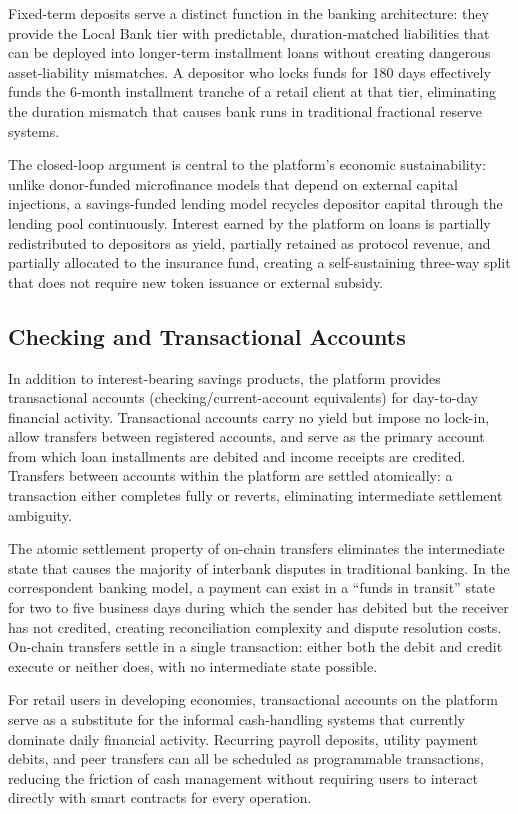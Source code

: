 \documentclass[12pt,a4paper]{report}
\begin{document}
Fixed-term deposits serve a distinct function in the banking architecture: they provide the Local Bank tier with predictable, duration-matched liabilities that can be deployed into longer-term installment loans without creating dangerous asset-liability mismatches. A depositor who locks funds for 180 days effectively funds the 6-month installment tranche of a retail client at that tier, eliminating the duration mismatch that causes bank runs in traditional fractional reserve systems.

The closed-loop argument is central to the platform's economic sustainability: unlike donor-funded microfinance models that depend on external capital injections, a savings-funded lending model recycles depositor capital through the lending pool continuously. Interest earned by the platform on loans is partially redistributed to depositors as yield, partially retained as protocol revenue, and partially allocated to the insurance fund, creating a self-sustaining three-way split that does not require new token issuance or external subsidy.

\subsection{Checking and Transactional Accounts}

In addition to interest-bearing savings products, the platform provides transactional accounts (checking/current-account equivalents) for day-to-day financial activity. Transactional accounts carry no yield but impose no lock-in, allow transfers between registered accounts, and serve as the primary account from which loan installments are debited and income receipts are credited. Transfers between accounts within the platform are settled atomically: a transaction either completes fully or reverts, eliminating intermediate settlement ambiguity.

The atomic settlement property of on-chain transfers eliminates the intermediate state that causes the majority of interbank disputes in traditional banking. In the correspondent banking model, a payment can exist in a ``funds in transit'' state for two to five business days during which the sender has debited but the receiver has not credited, creating reconciliation complexity and dispute resolution costs. On-chain transfers settle in a single transaction: either both the debit and credit execute or neither does, with no intermediate state possible.

For retail users in developing economies, transactional accounts on the platform serve as a substitute for the informal cash-handling systems that currently dominate daily financial activity. Recurring payroll deposits, utility payment debits, and peer transfers can all be scheduled as programmable transactions, reducing the friction of cash management without requiring users to interact directly with smart contracts for every operation.
\end{document}
